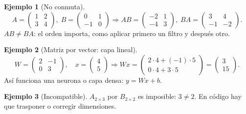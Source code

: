 \documentclass[a4paper,12pt]{article}
\theoremstyle{definition}
\newtheorem{ejemplo}{Ejemplo}[section]
\begin{document}
\begin{ejemplo}[No conmuta]
\[
A=\begin{pmatrix} 1 & 2 \\ 3 & 4 \end{pmatrix},\; B=\begin{pmatrix} 0 & 1 \\ -1 & 0 \end{pmatrix} \Rightarrow AB=\begin{pmatrix} -2 & 1 \\ -4 & 3 \end{pmatrix},\; BA=\begin{pmatrix} 3 & 4 \\ -1 & -2 \end{pmatrix}.
\]
$AB \neq BA$: el orden importa, como aplicar primero un filtro y después otro.
\end{ejemplo}

\begin{ejemplo}[Matriz por vector: capa lineal]
\[
W = \begin{pmatrix} 2 & -1 \\ 0 & 3 \end{pmatrix}, \quad x = \begin{pmatrix} 4 \\ 5 \end{pmatrix} \Rightarrow Wx = \begin{pmatrix} 2\cdot4+(-1)\cdot5 \\ 0\cdot4+3\cdot5 \end{pmatrix} = \begin{pmatrix} 3 \\ 15 \end{pmatrix}.
\]
Así funciona una neurona o capa densa: $y = Wx+b$.
\end{ejemplo}

\begin{ejemplo}[Incompatible]
$A_{2 \times 3}$ por $B_{2 \times 2}$ es imposible: $3 \neq 2$. En código hay que trasponer o corregir dimensiones.
\end{ejemplo}
\end{document}
